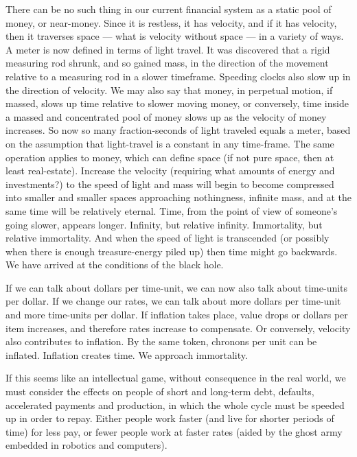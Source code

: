There can be no such thing in our current
financial system as a static pool of money, or
near-money. Since it is restless, it has velocity, and if it has velocity, then it traverses
space --- what is velocity without space --- in a
variety of ways. A meter is now defined in
terms of light travel. It was discovered that a
rigid measuring rod shrunk, and so gained
mass, in the direction of the movement relative to a measuring rod in a slower timeframe. Speeding clocks also slow up in the
direction of velocity. We may also say that money,
in perpetual motion, if massed,
slows up time relative to slower moving
money, or conversely, time inside a massed
and concentrated pool of money slows up as
the velocity of money increases. So now
so many fraction-seconds of light traveled
equals a meter, based on the assumption that
light-travel is a constant in any time-frame.
The same operation applies to money, which
can define space (if not pure space, then at
least real-estate). Increase the velocity (requiring what amounts of energy and investments?) to the speed of light and mass will
begin to become compressed into smaller
and smaller spaces approaching nothingness,
infinite mass, and at the same time will be
relatively eternal. Time, from the point of
view of someone's going slower, appears
longer. Infinity, but relative infinity. Immortality, but relative immortality. And when
the speed of light is transcended (or possibly
when there is enough treasure-energy piled
up) then time might go backwards. We have
arrived at the conditions of the black hole.

If we can talk about dollars per time-unit,
we can now also talk about time-units per
dollar. If we change our rates, we can talk
about more dollars per time-unit and more
time-units per dollar. If inflation takes place,
value drops or dollars per item increases,
and therefore rates increase to compensate.
Or conversely, velocity also contributes to
inflation. By the same token, chronons per
unit can be inflated. Inflation creates time.
We approach immortality.

If this seems like an intellectual game,
without consequence in the real world, we
must consider the effects on people of short
and long-term debt, defaults, accelerated
payments and production, in which the
whole cycle must be speeded up in order to
repay. Either people work faster (and live for
shorter periods of time) for less pay, or fewer
people work at faster rates (aided by the
ghost army embedded in robotics and computers).

